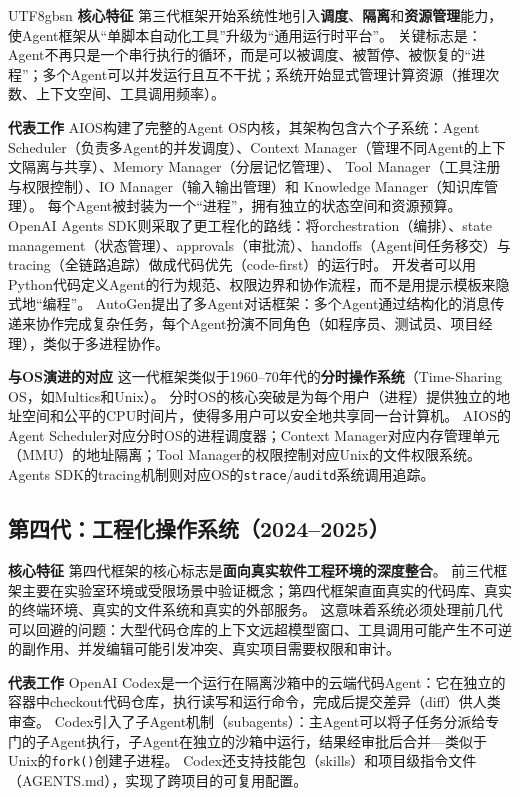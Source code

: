 \documentclass[11pt,a4paper]{article}
\begin{document}
\begin{CJK*}{UTF8}{gbsn}
\textbf{核心特征}
第三代框架开始系统性地引入\textbf{调度}、\textbf{隔离}和\textbf{资源管理}能力，使Agent框架从``单脚本自动化工具''升级为``通用运行时平台''。
关键标志是：Agent不再只是一个串行执行的循环，而是可以被调度、被暂停、被恢复的``进程''；多个Agent可以并发运行且互不干扰；系统开始显式管理计算资源（推理次数、上下文空间、工具调用频率）。

\textbf{代表工作}
AIOS\cite{mei2024aios}构建了完整的Agent OS内核，其架构包含六个子系统：Agent Scheduler（负责多Agent的并发调度）、Context Manager（管理不同Agent的上下文隔离与共享）、Memory Manager（分层记忆管理）、 Tool Manager（工具注册与权限控制）、IO Manager（输入输出管理）和 Knowledge Manager（知识库管理）。
每个Agent被封装为一个``进程''，拥有独立的状态空间和资源预算。
OpenAI Agents SDK\cite{openai_codex_agentsdk_2026}则采取了更工程化的路线：将orchestration（编排）、state management（状态管理）、approvals（审批流）、handoffs（Agent间任务移交）与tracing（全链路追踪）做成代码优先（code-first）的运行时。
开发者可以用Python代码定义Agent的行为规范、权限边界和协作流程，而不是用提示模板来隐式地``编程''。
AutoGen\cite{wu2023autogen}提出了多Agent对话框架：多个Agent通过结构化的消息传递来协作完成复杂任务，每个Agent扮演不同角色（如程序员、测试员、项目经理），类似于多进程协作。

\textbf{与OS演进的对应}
这一代框架类似于1960--70年代的\textbf{分时操作系统}（Time-Sharing OS，如Multics和Unix）。
分时OS的核心突破是为每个用户（进程）提供独立的地址空间和公平的CPU时间片，使得多用户可以安全地共享同一台计算机。
AIOS的Agent Scheduler对应分时OS的进程调度器；Context Manager对应内存管理单元（MMU）的地址隔离；Tool Manager的权限控制对应Unix的文件权限系统。
Agents SDK的tracing机制则对应OS的\texttt{strace}/\texttt{auditd}系统调用追踪。

\subsection*{第四代：工程化操作系统（2024--2025）}

\textbf{核心特征}
第四代框架的核心标志是\textbf{面向真实软件工程环境的深度整合}。
前三代框架主要在实验室环境或受限场景中验证概念；第四代框架直面真实的代码库、真实的终端环境、真实的文件系统和真实的外部服务。
这意味着系统必须处理前几代可以回避的问题：大型代码仓库的上下文远超模型窗口、工具调用可能产生不可逆的副作用、并发编辑可能引发冲突、真实项目需要权限和审计。

\textbf{代表工作}
OpenAI Codex\cite{openai_codex_overview_2026}是一个运行在隔离沙箱中的云端代码Agent：它在独立的容器中checkout代码仓库，执行读写和运行命令，完成后提交差异（diff）供人类审查。
Codex引入了子Agent机制（subagents）\cite{openai_codex_subagents_2026}：主Agent可以将子任务分派给专门的子Agent执行，子Agent在独立的沙箱中运行，结果经审批后合并---类似于Unix的\texttt{fork()}创建子进程。
Codex还支持技能包（skills）\cite{openai_codex_skills_2026}和项目级指令文件（AGENTS.md）\cite{openai_codex_agents_md_2026}，实现了跨项目的可复用配置。


\end{CJK*}
\end{document}
